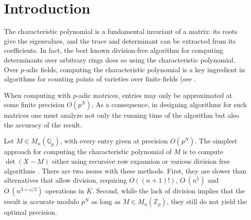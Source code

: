 \documentclass{sig-alternate-05-2015}
\newcommand{\Z}{\mathbb Z}
\newcommand{\Zp}{\Z_p}
\newcommand{\Q}{\mathbb Q}
\newcommand{\Qp}{\Q_p}
\newcommand{\softO}{O\tilde{~}}
\def\todo#1{\ \!\!{\color{red} #1}}
\begin{document}
\vspace{-1.5mm}

%
%

\section{Introduction}

The characteristic polynomial is a fundamental invariant of a matrix: its roots
give the eigenvalues, and the trace and determinant can be extracted from its coefficients.
In fact, the best known division-free algorithm for computing determinants
over arbitrary rings \cite{kaltofen-villard:04a} does so using the characteristic polynomial.
Over $p$-adic fields, computing the characteristic polynomial is a key ingredient in
algorithms for counting points of varieties over finite fields (see
\cite{kedlaya:01a, harvey:07a, harvey:14a}.


When computing with $p$-adic matrices, entries may only be approximated
at some finite precision $O(p^N)$.  As a
consequence, in designing algorithms for such matrices one must analyze
not only the running time of the algorithm but also the accuracy of the result.

Let $M \in M_n(\Qp)$, with every entry given at precision $O(p^N)$.
The simplest approach for computing the characteristic polynomial of $M$
is to compute $\det(X-M)$ either using recursive row expansion or various division free
algorithms .  There are two issues
with these methods.  First, they are slower than alternatives that allow division,
requiring $O((n+1)!)$, $\softO(n^5)$ and $\softO(n^{3 + \omega/2})$ operations in $K$.  Second,
while the lack of division implies that the result is accurate modulo $p^N$ as
long as $M \in M_n(\Zp)$, they still do not yield the optimal precision.
\end{document}
